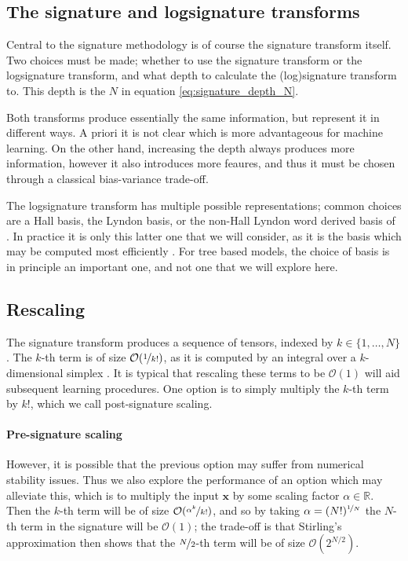 \documentclass{article}
\theoremstyle{definition}
\theoremstyle{remark}
\newcommand{\reals}{\mathbb{R}}
\newcommand{\bigO}{\mathcal{O}}
\newcommand{\ttfrac}[2]{\nicefrac{#1}{#2}}
\begin{document}
	\subsection{The signature and logsignature transforms}
	Central to the signature methodology is of course the signature transform itself. Two choices must be made; whether to use the signature transform or the logsignature transform, and what depth to calculate the (log)signature transform to. This depth is the $N$ in equation \eqref{eq:signature_depth_N}.
	
	Both transforms produce essentially the same information, but represent it in different ways. A priori it is not clear which is more advantageous for machine learning. On the other hand, increasing the depth always produces more information, however it also introduces more feaures, and thus it must be chosen through a classical bias-variance trade-off.
	
	The logsignature transform has multiple possible representations; common choices are a Hall basis, the Lyndon basis, or the non-Hall Lyndon word derived basis of \citet{signatory}. In practice it is only this latter one that we will consider, as it is the basis which may be computed most efficiently \citep{signatory}. For tree based models, the choice of basis is in principle an important one, and not one that we will explore here.

	\subsection{Rescaling}\label{section:rescaling}
	The signature transform produces a sequence of tensors, indexed by $k \in \{1, \ldots, N\}$. The $k$-th term is of size $\bigO(\ttfrac{1}{k!})$, as it is computed by an integral over a $k$-dimensional simplex \citep[Proposition A.5]{kidger2019deep}. It is typical that rescaling these terms to be $\bigO(1)$ will aid subsequent learning procedures. One option is to simply multiply the $k$-th term by $k!$, which we call post-signature scaling.
	
	\paragraph{Pre-signature scaling} However, it is possible that the previous option may suffer from numerical stability issues. Thus we also explore the performance of an option which may alleviate this, which is to multiply the input $\mathbf{x}$ by some scaling factor $\alpha \in \reals$. Then the $k$-th term will be of size $\bigO(\ttfrac{\alpha^k}{k!})$, and so by taking $\alpha = (N!)^{\ttfrac{1}{N}}$ the $N$-th term in the signature will be $\bigO(1)$; the trade-off is that Stirling's approximation then shows that the $\ttfrac{N}{2}$-th term will be of size $\bigO(2^{N/2})$.
	
\end{document}
